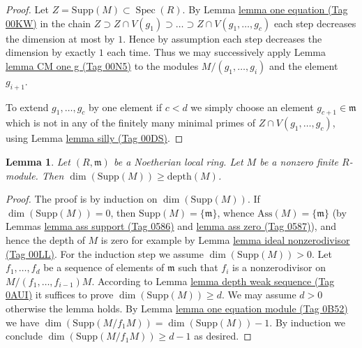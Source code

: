 \documentclass{amsart}
\theoremstyle{plain}
\newtheorem{lemma}[subsection]{Lemma}
\theoremstyle{definition}
\theoremstyle{remark}
\numberwithin{equation}{subsection}
\def\Spec{\mathop{\mathrm{Spec}}}
\begin{document}
\begin{proof}
Let $Z = \text{Supp}(M) \subset \Spec(R)$.
By Lemma \href{https://stacks.math.columbia.edu/tag/00KW}{lemma one equation (Tag 00KW)} in the chain
$Z \supset Z \cap V(g_1) \supset \ldots \supset Z \cap V(g_1, \ldots, g_c)$
each step decreases the dimension at most by $1$. Hence by assumption
each step decreases the dimension by exactly $1$ each time. Thus we
may successively apply Lemma \href{https://stacks.math.columbia.edu/tag/00N5}{lemma CM one g (Tag 00N5)} to the modules
$M/(g_1, \ldots, g_i)$ and the element $g_{i + 1}$.

\medskip\noindent
To extend $g_1, \ldots, g_c$ by one element if $c < d$ we simply
choose an element $g_{c + 1} \in \mathfrak m$ which is not
in any of the finitely many minimal primes of $Z \cap V(g_1, \ldots, g_c)$,
using Lemma \href{https://stacks.math.columbia.edu/tag/00DS}{lemma silly (Tag 00DS)}.
\end{proof}


\begin{lemma}
\label{lemma-bound-depth}
Let $(R, \mathfrak m)$ be a Noetherian local ring.
Let $M$ be a nonzero finite $R$-module.
Then $\dim(\text{Supp}(M)) \geq \text{depth}(M)$.
\end{lemma}

\begin{proof}
The proof is by induction on $\dim(\text{Supp}(M))$.
If $\dim(\text{Supp}(M)) = 0$, then
$\text{Supp}(M) = \{\mathfrak m\}$, whence $\text{Ass}(M) = \{\mathfrak m\}$
(by Lemmas \href{https://stacks.math.columbia.edu/tag/0586}{lemma ass support (Tag 0586)} and \href{https://stacks.math.columbia.edu/tag/0587}{lemma ass zero (Tag 0587)}), and hence
the depth of $M$ is zero for example by
Lemma \href{https://stacks.math.columbia.edu/tag/00LL}{lemma ideal nonzerodivisor (Tag 00LL)}.
For the induction step we assume $\dim(\text{Supp}(M)) > 0$.
Let $f_1, \ldots, f_d$ be a sequence of elements of $\mathfrak m$
such that $f_i$ is a nonzerodivisor on $M/(f_1, \ldots, f_{i - 1})M$.
According to Lemma \href{https://stacks.math.columbia.edu/tag/0AUI}{lemma depth weak sequence (Tag 0AUI)} it suffices to prove
$\dim(\text{Supp}(M)) \geq d$. We may assume
$d > 0$ otherwise the lemma holds. By
Lemma \href{https://stacks.math.columbia.edu/tag/0B52}{lemma one equation module (Tag 0B52)}
we have $\dim(\text{Supp}(M/f_1M)) = \dim(\text{Supp}(M)) - 1$.
By induction we conclude $\dim(\text{Supp}(M/f_1M)) \geq d - 1$
as desired.
\end{proof}
\end{document}
